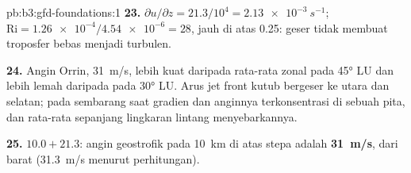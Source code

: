 \begin{solution}{pb:b3:gfd-foundations:1}
\textbf{23.} $\partial u/\partial z = 21.3/10^4 = \qty{2.13e-3}{s^{-1}}$;
$\mathrm{Ri} = \num{1.26e-4}/\num{4.54e-6} = 28$, jauh di atas 0.25: geser
tidak membuat troposfer bebas menjadi turbulen.

\textbf{24.} Angin Orrin, \qty{31}{m/s}, lebih kuat daripada rata-rata zonal
pada \ang{45} LU dan lebih lemah daripada pada \ang{30} LU. Arus jet front kutub
bergeser ke utara dan selatan; pada sembarang saat gradien dan anginnya
terkonsentrasi di sebuah pita, dan rata-rata sepanjang lingkaran lintang menyebarkannya.

\textbf{25.} $10.0 + 21.3$: angin geostrofik pada \qty{10}{km} di atas
stepa adalah \textbf{\qty[text-series-to-math=true]{31}{m/s}}, dari barat
(\qty{31.3}{m/s} menurut perhitungan).
\end{solution}
